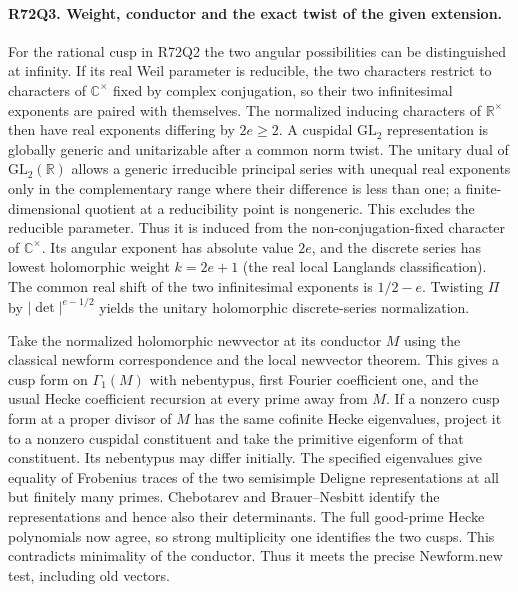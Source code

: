 \paragraph{R72Q3. Weight, conductor and the exact twist of the given extension.}
For the rational cusp in R72Q2 the two angular possibilities
can be distinguished at infinity. If its real Weil parameter
is reducible, the two characters restrict to characters of
$\mathbb C^\times$ fixed by complex conjugation, so their
two infinitesimal exponents are paired with themselves. The
normalized inducing characters of $\mathbb R^\times$ then
have real exponents differing by $2e\ge2$. A cuspidal
$\mathrm{GL}_2$ representation is globally generic and
unitarizable after a common norm twist. The unitary dual of
$\mathrm{GL}_2(\mathbb R)$ allows a generic irreducible principal
series with unequal real exponents only in the complementary
range where their difference is less than one; a finite-dimensional
quotient at a reducibility point is nongeneric. This excludes the
reducible parameter. Thus it is induced from the non-conjugation-fixed
character of $\mathbb C^\times$. Its angular exponent has absolute
value $2e$, and the discrete series has lowest holomorphic weight
$k=2e+1$ (the real local Langlands classification).
The common real shift of the two infinitesimal exponents is
$1/2-e$. Twisting $\Pi$ by $|\det|^{e-1/2}$ yields the unitary
holomorphic discrete-series normalization.

Take the normalized holomorphic newvector at its conductor $M$
using the classical newform correspondence and the local
newvector theorem. This gives a cusp form on $\Gamma_1(M)$
with nebentypus, first Fourier coefficient one, and the usual
Hecke coefficient recursion at every prime away from $M$.
If a nonzero cusp form at a proper divisor of $M$ has the same
cofinite Hecke eigenvalues, project it to a nonzero cuspidal
constituent and take the primitive eigenform of that constituent.
Its nebentypus may differ initially. The specified eigenvalues
give equality of Frobenius traces of the two semisimple Deligne
representations at all but finitely many primes. Chebotarev and
Brauer--Nesbitt identify the representations and hence also their
determinants. The full good-prime Hecke polynomials now agree, so
strong multiplicity one identifies the two cusps. This contradicts
minimality of the conductor. Thus it meets the precise
$\mathrm{Newform.new}$ test, including old vectors.

